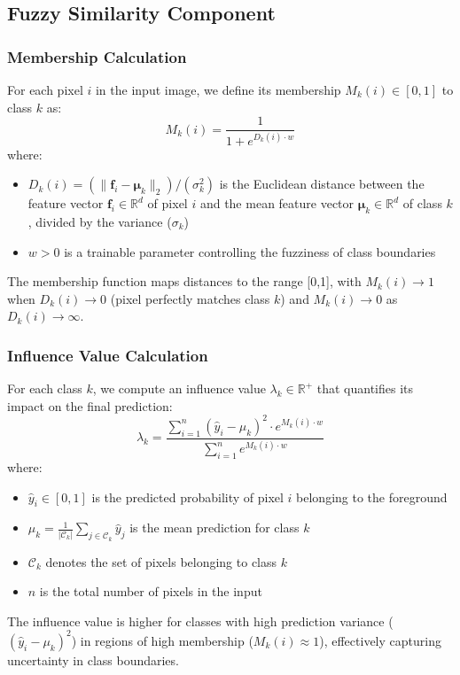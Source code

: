 \documentclass[review]{elsarticle}
\begin{document}
\subsection{Fuzzy Similarity Component}
\subsubsection{Membership Calculation}
For each pixel $i$ in the input image, we define its membership $M_k(i) \in [0,1]$ to class $k$ as:
\begin{equation}\label{Eq-1}
    M_k(i) = \frac{1}{1 + e^{D_k(i) \cdot w}}
\end{equation}
where:
\begin{itemize}
    \item $D_k(i) = (\|\mathbf{f}_i - \boldsymbol{\mu}_k\|_2)/(\sigma^2_k)$ is the Euclidean distance between the feature vector $\mathbf{f}_i \in \mathbb{R}^d$ of pixel $i$ and the mean feature vector $\boldsymbol{\mu}_k \in \mathbb{R}^d$ of class $k$, divided by the variance ($\sigma_k$)
    \item $w > 0$ is a trainable parameter controlling the fuzziness of class boundaries
\end{itemize}
The membership function maps distances to the range [0,1], with $M_k(i) \rightarrow 1$ when $D_k(i) \rightarrow 0$ (pixel perfectly matches class $k$) and $M_k(i) \rightarrow 0$ as $D_k(i) \rightarrow \infty$.

\subsubsection{Influence Value Calculation}
For each class $k$, we compute an influence value $\lambda_k \in \mathbb{R}^+$ that quantifies its impact on the final prediction:
\begin{equation}\label{Eq-3}
    \lambda_k = \frac{\sum_{i=1}^n (\hat{y}_i - \mu_k)^2 \cdot e^{M_k(i) \cdot w}}{\sum_{i=1}^n e^{M_k(i) \cdot w}}
\end{equation}
where:
\begin{itemize}
    \item $\hat{y}_i \in [0,1]$ is the predicted probability of pixel $i$ belonging to the foreground
    \item $\mu_k = \frac{1}{|\mathcal{C}_k|}\sum_{j \in \mathcal{C}_k} \hat{y}_j$ is the mean prediction for class $k$
    \item $\mathcal{C}_k$ denotes the set of pixels belonging to class $k$
    \item $n$ is the total number of pixels in the input
\end{itemize}
The influence value is higher for classes with high prediction variance ($(\hat{y}_i - \mu_k)^2$) in regions of high membership ($M_k(i) \approx 1$), effectively capturing uncertainty in class boundaries.
\end{document}
